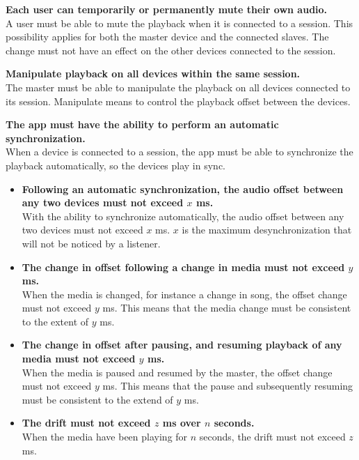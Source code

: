 \begin{eletterate}
    \item \textbf{Each user can temporarily or permanently mute their own audio.} \hfill\\
        A user must be able to mute the playback when it is connected to a session.
        This possibility applies for both the master device and the connected slaves.
        The change must not have an effect on the other devices connected to the session.
    
    \item \textbf{Manipulate playback on all devices within the same session.} \hfill\\
        The master must be able to manipulate the playback on all devices connected to its session.
        Manipulate means to control the playback offset between the devices.
    
    \item \textbf{The app must have the ability to perform an automatic synchronization.} \hfill\\
        When a device is connected to a session, the app must be able to synchronize the playback automatically,
        so the devices play in sync.

    \begin{itemize}
        \item \textbf{Following an automatic synchronization, the audio offset between any two devices must not exceed $x$ ms.} \hfill\\
            With the ability to synchronize automatically, the audio offset between any two devices must not exceed $x$ ms.
            $x$ is the maximum desynchronization that will not be noticed by a listener.

        \item \textbf{The change in offset following a change in media must not exceed $y$ ms.} \hfill\\
            When the media is changed, for instance a change in song, the offset change must not exceed $y$ ms.
            This means that the media change must be consistent to the extent of $y$ ms.

        \item \textbf{The change in offset after pausing, and resuming playback of any media must not exceed $y$ ms.} \hfill\\
            When the media is paused and resumed by the master, the offset change must not exceed $y$ ms.
            This means that the pause and subsequently resuming must be consistent to the extend of $y$ ms.

        \item \textbf{The drift must not exceed $z$ ms over $n$ seconds.} \hfill\\
            When the media have been playing for $n$ seconds, the drift must not exceed $z$ ms.
    \end{itemize}
\end{eletterate}
